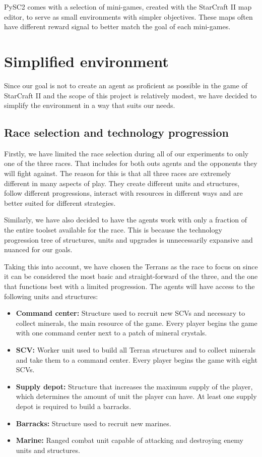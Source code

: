 PySC2 comes with a selection of mini-games, created with the StarCraft II map editor, to serve as small environments with simpler objectives. These maps often have different reward signal to better match the goal of each mini-games.

\section{Simplified environment}

Since our goal is not to create an agent as proficient as possible in the game of StarCraft II and the scope of this project is relatively modest, we have decided to simplify the environment in a way that suits our needs.

\subsection{Race selection and technology progression}

Firstly, we have limited the race selection during all of our experiments to only one of the three races. That includes for both outs agents and the opponents they will fight against. The reason for this is that all three races are extremely different in many aspects of play. They create different units and structures, follow different progressions, interact with resources in different ways and are better suited for different strategies.

Similarly, we have also decided to have the agents work with only a fraction of the entire toolset available for the race. This is because the technology progression tree of structures, units and upgrades is unnecessarily expansive and nuanced for our goals.

Taking this into account, we have chosen the Terrans as the race to focus on since it can be considered the most basic and straight-forward of the three, and the one that functions best with a limited progression. The agents will have access to the following units and structures:

\begin{itemize}
    \item \textbf{Command center:} Structure used to recruit new SCVs and necessary to collect minerals, the main resource of the game. Every player begins the game with one command center next to a patch of mineral crystals.
    \item \textbf{SCV:} Worker unit used to build all Terran structures and to collect minerals and take them to a command center. Every player begins the game with eight SCVs.
    \item \textbf{Supply depot:} Structure that increases the maximum supply of the player, which determines the amount of unit the player can have. At least one supply depot is required to build a barracks.
    \item \textbf{Barracks:} Structure used to recruit new marines.
    \item \textbf{Marine:} Ranged combat unit capable of attacking and destroying enemy units and structures.
\end{itemize}

